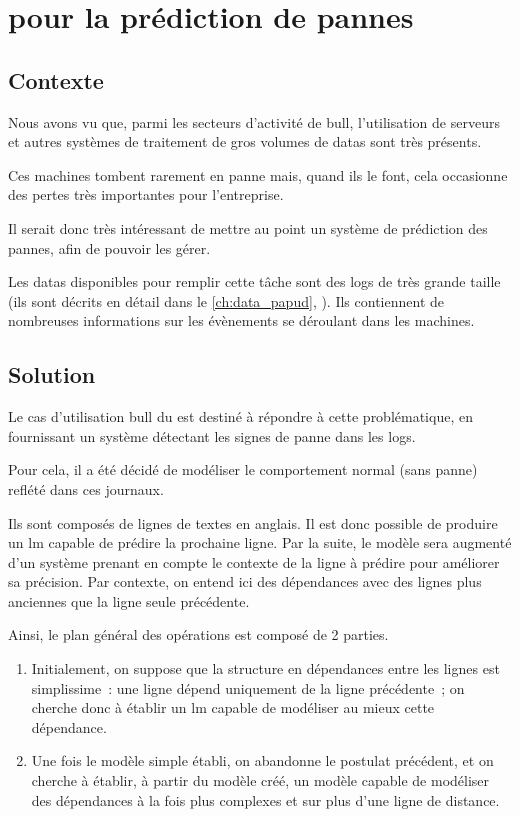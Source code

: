 \chapter{ pour la prédiction de pannes\label{ch:project_papud}}
\section{Contexte}
Nous avons vu que, parmi les secteurs d'activité de \gls{bull}, l'utilisation de serveurs et autres systèmes de traitement de gros volumes de \glspl{data} sont très présents.

Ces machines tombent rarement en panne mais, quand ils le font, cela occasionne des pertes très importantes pour l'entreprise.

Il serait donc très intéressant de mettre au point un système de prédiction des pannes, afin de pouvoir les gérer.

Les \glspl{data} disponibles pour remplir cette tâche sont des \glspl{log}  de très grande taille (ils sont décrits en détail dans le \autoref{ch:data_papud}, ).
Ils contiennent de nombreuses informations sur les évènements se déroulant dans les machines.

\section{Solution}\label{sec:solution}

Le cas d'utilisation \gls{bull} du  est destiné à répondre à cette problématique, en fournissant un système détectant les signes de panne dans les \glspl{log}.

Pour cela, il a été décidé de modéliser le comportement normal (sans panne) reflété dans ces journaux.

Ils sont composés de lignes de textes en anglais. Il est donc possible de produire un \gls{lm} capable de prédire la prochaine ligne.
Par la suite, le modèle sera augmenté d'un système prenant en compte le contexte de la ligne à prédire pour améliorer sa précision.
Par contexte, on entend ici des dépendances avec des lignes plus anciennes que la ligne seule précédente.

Ainsi, le plan général des opérations est composé de 2 parties.
\begin{enumerate}
	\item Initialement, on suppose que la structure en dépendances entre les lignes est simplissime~: une ligne dépend uniquement de la ligne précédente~; on cherche donc à établir un \gls{lm} capable de modéliser au mieux cette dépendance.
	\item Une fois le modèle simple établi, on abandonne le postulat précédent, et on cherche à établir, à partir du modèle créé, un modèle capable de modéliser des dépendances à la fois plus complexes et sur plus d'une ligne de distance.
\end{enumerate}
\hspace{1em}

